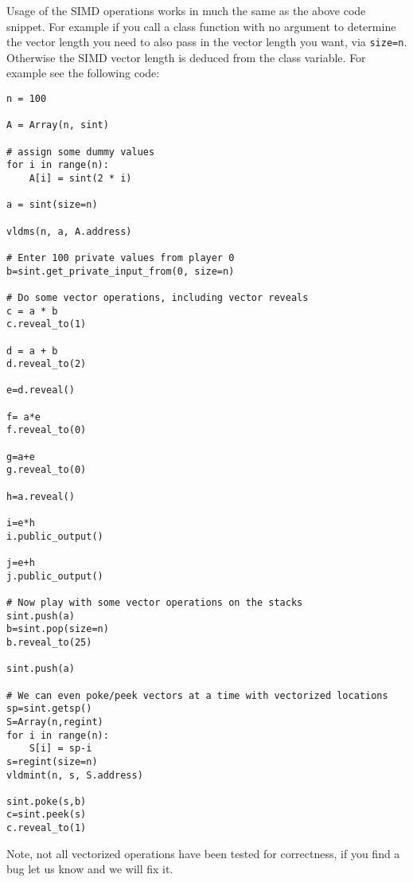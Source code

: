 Usage of the SIMD operations works in much the same as the above code snippet.
For example if you call a class function with no argument to determine the
vector length you need to also pass in the vector length you want, via
\verb|size=n|. Otherwise the SIMD vector length is deduced from the class
variable.
For example see the following code:
\begin{lstlisting}
n = 100

A = Array(n, sint)

# assign some dummy values
for i in range(n):
    A[i] = sint(2 * i)

a = sint(size=n)

vldms(n, a, A.address)

# Enter 100 private values from player 0
b=sint.get_private_input_from(0, size=n)

# Do some vector operations, including vector reveals
c = a * b
c.reveal_to(1)

d = a + b
d.reveal_to(2)

e=d.reveal()

f= a*e
f.reveal_to(0)

g=a+e
g.reveal_to(0)

h=a.reveal()

i=e*h
i.public_output()

j=e+h
j.public_output()

# Now play with some vector operations on the stacks
sint.push(a)
b=sint.pop(size=n)
b.reveal_to(25)

sint.push(a)

# We can even poke/peek vectors at a time with vectorized locations
sp=sint.getsp()
S=Array(n,regint)
for i in range(n):
    S[i] = sp-i
s=regint(size=n)
vldmint(n, s, S.address)

sint.poke(s,b)
c=sint.peek(s)
c.reveal_to(1)

\end{lstlisting}
Note, not all vectorized operations have been tested for correctness, if you
find a bug let us know and we will fix it.


